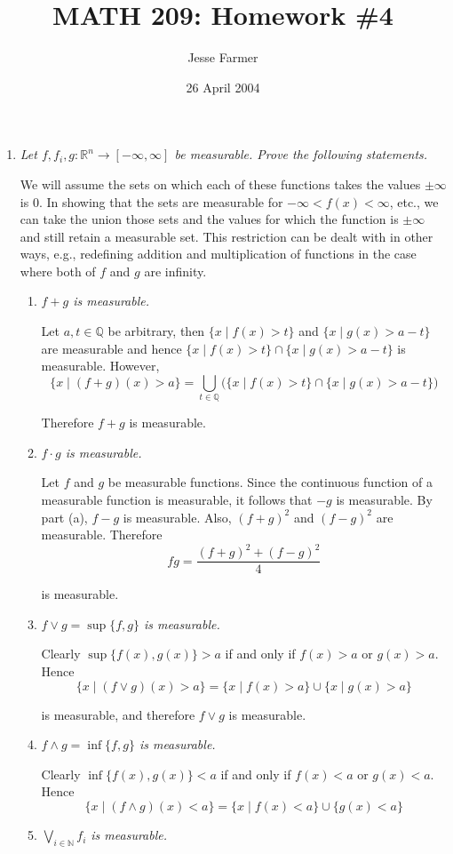 \documentclass[11pt]{article}
\title{MATH 209: Homework \#4}
\author{Jesse Farmer}
\date{26 April 2004}
\newcommand{\R}{\mathbb{R}}
\newcommand{\Q}{\mathbb{Q}}
\newcommand{\N}{\mathbb{N}}
\begin{document}
\maketitle
\begin{enumerate}
\item \emph{Let $f,f_i,g: \R^n \rightarrow [-\infty,\infty]$ be measurable.  Prove the following statements.}

We will assume the sets on which each of these functions takes the values $\pm \infty$ is $0$.  In showing that the sets are measurable for $-\infty< f(x) < \infty$, etc., we can take the union those sets and the values for which the function is $\pm \infty$ and still retain a measurable set.  This restriction can be dealt with in other ways, e.g., redefining addition and multiplication of functions in the case where both of $f$ and $g$ are infinity.

\begin{enumerate}
\item \emph{$f+g$ is measurable.}

Let $a,t \in \Q$ be arbitrary, then $\{x \mid f(x) > t\}$ and $\{x \mid g(x) > a-t\}$ are measurable and hence $\{x \mid f(x) > t\} \cap \{x \mid g(x) > a-t\}$ is measurable.  However,
\[
\{x \mid (f+g)(x) > a\} = \bigcup_{t \in \Q}\big( \{x \mid f(x) > t\} \cap \{x \mid g(x) > a-t\}\big)
\]

Therefore $f+g$ is measurable.
\item \emph{$f \cdot g$ is measurable.}

Let $f$ and $g$ be measurable functions.  Since the continuous function of a measurable function is measurable, it follows that $-g$ is measurable.  By part (a), $f-g$ is measurable.  Also, $(f+g)^2$ and $(f-g)^2$ are measurable.  Therefore
\[
fg = \frac{(f+g)^2 + (f-g)^2}{4}
\]

is measurable.
\item \emph{$f \vee g = \sup\{f, g\}$ is measurable.}

Clearly $\sup\{f(x), g(x)\} > a$ if and only if $f(x) > a$ or $g(x) > a$. Hence
\[
\{ x \mid (f \vee g)(x) > a\} = \{x \mid f(x) > a\} \cup \{x \mid g(x) > a\}
\]

is measurable, and therefore $f \vee g$ is measurable.

\item \emph{$f \wedge g = \inf\{f,g\}$ is measurable.}

Clearly $\inf\{f(x),g(x)\} < a$ if and only if $f(x) < a$ or $g(x) < a$.  Hence
\[
\{x \mid (f \wedge g)(x) < a\} = \{x \mid f(x) < a\} \cup \{g(x) < a\}
\] 
\item \emph{$\bigvee_{i \in \N} f_i$ is measurable.}


\end{enumerate}
\end{enumerate}
\end{document}
